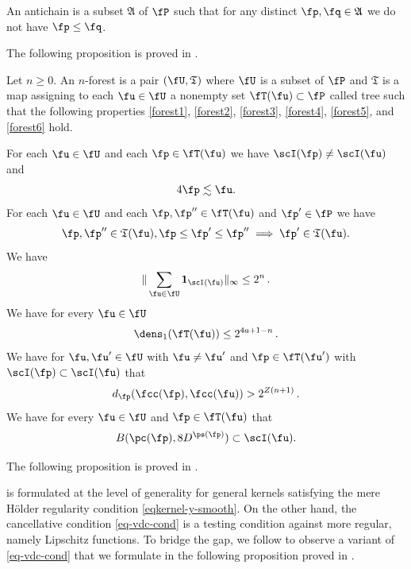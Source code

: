 An antichain is a subset $\mathfrak{A}$
of $\fP$ such that for any distinct $\fp,\fq\in \mathfrak{A}$ we do not have $\fp\le \fq$.

The following proposition is proved in .


Let $n\ge 0$.
An $n$-forest is a pair $(\fU, \mathfrak{T})$
where $\fU$ is a subset of $\fP$
and $\mathfrak{T}$ is a map assigning to
each $\fu\in \fU$ a nonempty set $\fT (\fu)\subset \fP$ called tree
such that the following properties
\eqref{forest1}, \eqref{forest2},
\eqref{forest3},
\eqref{forest4},
\eqref{forest5}, and
\eqref{forest6}
hold.

For each $\fu\in \fU$ and each $\fp\in \fT(\fu)$
we have $\scI(\fp) \ne \scI(\fu)$ and
\begin{equation}\label{forest1}
    4\fp\lesssim \fu.
\end{equation}
For each $\fu \in \fU$ and each $\fp,\fp''\in \fT(\fu)$ and $\fp'\in \fP$
we have
\begin{equation}\label{forest2}
    \fp, \fp'' \in \mathfrak{T}(\fu), \fp \leq \fp' \leq \fp'' \implies \fp' \in \mathfrak{T}(\fu).
\end{equation}
We have
\begin{equation}\label{forest3}
   \|\sum_{\fu\in \fU} \mathbf{1}_{\scI(\fu)}\|_\infty \leq 2^n\,.
\end{equation}
We have for every $\fu\in \fU$
\begin{equation}\label{forest4}
    \dens_1(\fT(\fu))\le 2^{4a + 1-n}\, .
\end{equation}
We have for $\fu, \fu'\in \fU$ with $\fu\neq \fu'$ and $\fp\in \fT(\fu')$ with $\scI(\fp)\subset \scI(\fu)$ that
\begin{equation}\label{forest5}
    d_{\fp}(\fcc(\fp), \fcc(\fu))>2^{Z(n+1)}\, .
\end{equation}
We have for every $\fu\in \fU$ and $\fp\in \fT(\fu)$ that
\begin{equation}\label{forest6}
    B(\pc(\fp), 8D^{\ps(\fp)})\subset \scI(\fu).
\end{equation}


The following proposition is proved in .

 is formulated at the level of generality
for general kernels satisfying the mere H\"older regularity condition \eqref{eqkernel-y-smooth}. On the other hand, the cancellative condition \eqref{eq-vdc-cond} is a testing condition against more regular,
namely Lipschitz functions. To bridge the gap, we follow \cite{zk-polynomial} to observe a variant of \eqref{eq-vdc-cond} that we formulate
in the following proposition proved in .


